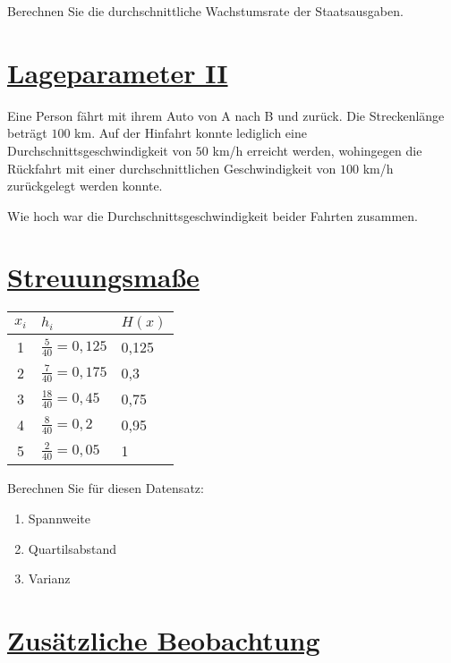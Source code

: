 \documentclass[12pt,a4paper]{article}
\newcommand{\tmpsection}[1]{}
\let\tmpsection=\section
\renewcommand{\section}[1]{\tmpsection{\underline{#1}} }
\begin{document}
Berechnen Sie die durchschnittliche Wachstumsrate der Staatsausgaben.

\hypertarget{lageparameter-ii}{%
\section{Lageparameter II}\label{lageparameter-ii}}

Eine Person fährt mit ihrem Auto von A nach B und zurück. Die
Streckenlänge beträgt \(100\) km. Auf der Hinfahrt konnte lediglich eine
Durchschnittsgeschwindigkeit von \(50\) km/h erreicht werden, wohingegen
die Rückfahrt mit einer durchschnittlichen Geschwindigkeit von \(100\)
km/h zurückgelegt werden konnte.

Wie hoch war die Durchschnittsgeschwindigkeit beider Fahrten zusammen.

\hypertarget{streuungsmauxdfe}{%
\section{Streuungsmaße}\label{streuungsmauxdfe}}

\begin{center}
  \begin{tabular}{cll}
    $x_i$& $h_i$&  $H(x)$\\
  \toprule
    1&$\frac{5}{40}=0,125$&0,125\\[2mm]
    2&$\frac{7}{40}=0,175$&0,3\\[2mm]
    3&$\frac{18}{40}=0,45$&0,75\\[2mm]
    4&$\frac{8}{40}=0,2$&0,95\\[2mm]
    5&$\frac{2}{40}=0,05$&1\\
  \end{tabular}
\end{center}

\newpage

Berechnen Sie für diesen Datensatz:

\begin{enumerate}[label=(\alph*)]
  \item Spannweite 
  \item Quartilsabstand 
  \item Varianz
\end{enumerate}

\hypertarget{zusuxe4tzliche-beobachtung}{%
\section{Zusätzliche Beobachtung}\label{zusuxe4tzliche-beobachtung}}
\end{document}
